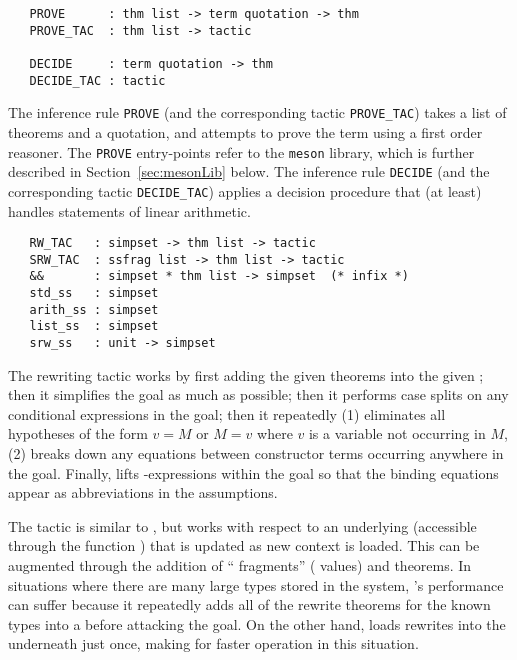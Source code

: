 \begin{verbatim}
   PROVE      : thm list -> term quotation -> thm
   PROVE_TAC  : thm list -> tactic

   DECIDE     : term quotation -> thm
   DECIDE_TAC : tactic
\end{verbatim}

The inference rule \texttt{PROVE} (and the corresponding tactic
\texttt{PROVE\_TAC}) takes a list of theorems and a quotation, and
attempts to prove the term using a first order reasoner.  The
\texttt{PROVE} entry-points refer to the \texttt{meson} library, which
is further described in Section~\ref{sec:mesonLib} below. The
inference rule \texttt{DECIDE} (and the corresponding tactic
\texttt{DECIDE\_TAC}) applies a decision procedure that (at least)
handles statements of linear arithmetic.

\begin{verbatim}
   RW_TAC   : simpset -> thm list -> tactic
   SRW_TAC  : ssfrag list -> thm list -> tactic
   &&       : simpset * thm list -> simpset  (* infix *)
   std_ss   : simpset
   arith_ss : simpset
   list_ss  : simpset
   srw_ss   : unit -> simpset
\end{verbatim}

 The rewriting tactic  works by
first adding the given theorems into the given \simpset; then it
simplifies the goal as much as possible; then it performs case splits
on any conditional expressions in the goal; then it repeatedly (1)
eliminates all hypotheses of the form $v = M$ or $M = v$ where $v$ is
a variable not occurring in $M$, (2) breaks down any equations between
constructor terms occurring anywhere in the goal. Finally,
 lifts -expressions within the goal so that
the binding equations appear as
abbreviations in the
assumptions.

 The tactic  is similar to
, but works with respect to an underlying \simpset{}
(accessible through the function ) that is updated as new
context is loaded.  This \simpset{} can be augmented through the
addition of ``\simpset{} fragments'' ( values) and
theorems.  In situations where there are many large types stored in
the system, 's performance can suffer because it
repeatedly adds all of the rewrite theorems for the known types into a
\simpset{} before attacking the goal.  On the other hand,
 loads rewrites into the \simpset{} underneath
 just once, making for faster operation in this
situation.

